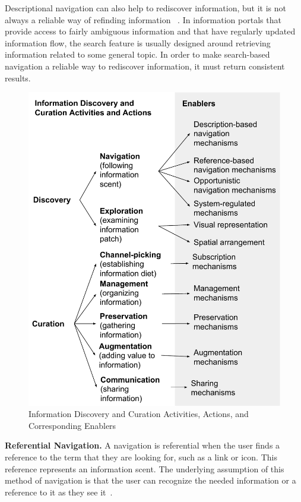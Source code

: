 \documentclass{sigchi}
\begin{document}
{{Descriptional navigation can also help to rediscover information, but it is not always a reliable way of refinding information ~\cite{cockburn2003improving}. In information portals that provide access to fairly ambiguous information and that have regularly updated information flow, the search feature is usually designed around retrieving information related to some general topic. In order to make search-based navigation a reliable way to rediscover information, it must return consistent results. 
} %


\begin{figure}[ht!]
	\noindent
	\centering
    \includegraphics[width=\linewidth]{figures/framework_enablers.pdf}
	\caption{Information Discovery and Curation Activities, Actions, and Corresponding Enablers}
	\label{fig:enablers} 
\end{figure}


\textbf{Referential Navigation.}
A navigation is referential when the user finds a reference to the term that they are looking for, such as a link or icon. This reference represents an information scent. The underlying assumption of this method of navigation is that the user can recognize the needed information or a reference to it as they see it~\cite{waterworth1991model}. 

}
\end{document}

